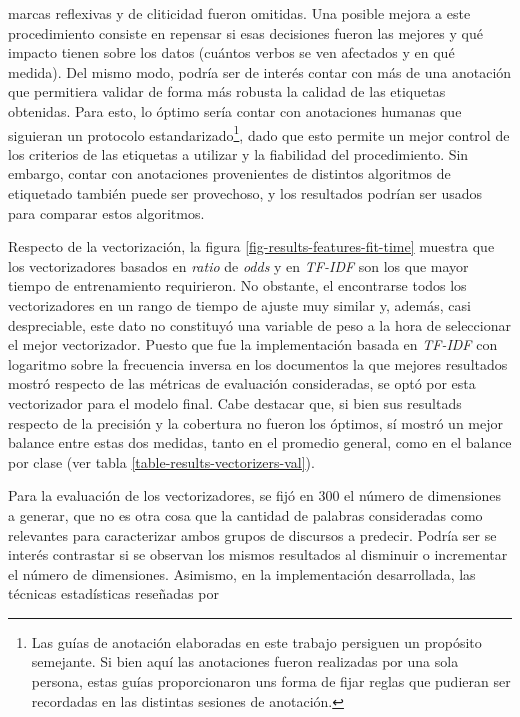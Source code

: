 marcas reflexivas y de cliticidad fueron omitidas.
Una posible mejora a este procedimiento consiste en repensar si esas
decisiones fueron las mejores y qu\'e impacto tienen sobre los datos
(cu\'antos verbos se ven afectados y en qu\'e medida). Del mismo modo,
podr\'ia ser de inter\'es contar con m\'as de una anotaci\'on que
permitiera validar de forma m\'as robusta la calidad de las etiquetas
obtenidas. Para esto, lo \'optimo ser\'ia contar con anotaciones
humanas que siguieran un protocolo estandarizado\footnote{Las gu\'ias
de anotaci\'on elaboradas en este trabajo persiguen un prop\'osito
semejante. Si bien aqu\'i las anotaciones fueron realizadas por una sola
persona, estas gu\'ias proporcionaron uns forma de fijar reglas que
pudieran ser recordadas en las distintas sesiones de anotaci\'on.}, dado
que esto permite un mejor control de los criterios de las 
etiquetas a utilizar y la fiabilidad del procedimiento. Sin embargo,
contar con anotaciones provenientes de distintos algoritmos de etiquetado
tambi\'en puede ser provechoso, y los resultados podr\'ian ser usados
para comparar estos algoritmos.
\par
Respecto de la vectorizaci\'on, la figura \ref{fig-results-features-fit-time}
muestra que los vectorizadores basados en \textit{ratio} de \textit{odds}
y en \textit{TF-IDF} son los que mayor tiempo de entrenamiento requirieron. No
obstante, el encontrarse todos los vectorizadores en un rango de tiempo
de ajuste muy similar y, adem\'as, casi despreciable, este dato no
constituy\'o una variable de peso a la hora de seleccionar el mejor vectorizador.
Puesto que fue la implementaci\'on basada en \textit{TF-IDF} con
logaritmo sobre la frecuencia inversa en los documentos la que
mejores resultados mostr\'o respecto de las m\'etricas de evaluaci\'on consideradas,
se opt\'o por esta vectorizador para el modelo final. Cabe destacar que, si bien
sus resultads respecto de la precisi\'on y la cobertura no fueron los \'optimos,
s\'i mostr\'o un mejor balance entre estas dos medidas, tanto en el promedio
general, como en el balance por clase (ver tabla \ref{table-results-vectorizers-val}).
\par
Para la evaluaci\'on de los vectorizadores, se fij\'o en $300$
el n\'umero de dimensiones a generar, que no es otra cosa que la
cantidad de palabras consideradas como relevantes para caracterizar
ambos grupos de discursos a predecir. Podr\'ia
ser se inter\'es contrastar si se observan los mismos resultados al
disminuir o incrementar el n\'umero de dimensiones. Asimismo, en la
implementaci\'on desarrollada, las t\'ecnicas estad\'isticas reseñadas por

